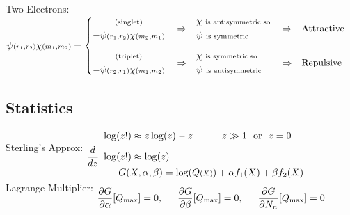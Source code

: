 \documentclass[12pt]{article}
\begin{document}
\vspace{15pt} \noindent
Two Electrons: \\[5pt]
\indent \(\psi{\scriptstyle(r_1,r_2)} \chi{\scriptstyle(m_1,m_2)} = \left\{\begin{aligned} 
    \begin{gathered}
        \text{\scriptsize(singlet)}\\
        - \psi{\scriptstyle(r_1,r_2)} \chi{\scriptstyle(m_2,m_1)} 
    \end{gathered}&&
        &\Rightarrow& &\begin{aligned}
            &\chi \ \text{\scriptsize is antisymmetric so} \\
            &\psi \ \text{\scriptsize is symmetric}
        \end{aligned}& 
        &\Rightarrow& &\text{Attractive} \\[5pt]
    \begin{gathered}
        \text{\scriptsize(triplet)}\\
        - \psi{\scriptstyle(r_2,r_1)} \chi{\scriptstyle(m_1,m_2)} 
    \end{gathered}&&
        &\Rightarrow& &\begin{aligned}
            &\chi \ \text{\scriptsize is symmetric so} \\
            &\psi \ \text{\scriptsize is antisymmetric}
        \end{aligned}& 
        &\Rightarrow& &\text{Repulsive} \\
\end{aligned}\right.\)

\newpage
\subsection{Statistics}
Sterling's Approx: \indent \(\begin{aligned}
    \log(z!) &\approx z \log(z) - z \indent \indent z \gg 1 \ \ \text{or} \ \ z = 0\\
    \frac{d}{dz} \ \log(z!) &\approx \log(z)
\end{aligned}\)\\[15pt]
Lagrange Multiplier: \indent \(\begin{gathered}
    G(X,\alpha,\beta) = \log(Q{\scriptstyle(X)}) + \alpha f_1(X) + \beta f_2(X)\\[5pt]
    \frac{\partial G}{\partial \alpha}[Q_\text{max}] = 0, \indent
    \frac{\partial G}{\partial \beta}[Q_\text{max}] = 0, \indent
    \frac{\partial G}{\partial N_n}[Q_\text{max}] = 0
\end{gathered}\)
\end{document}
